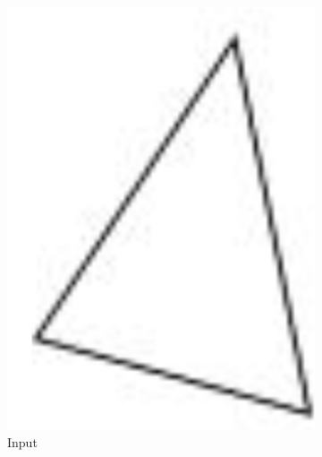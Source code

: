 \begin{figure}
	\centering
	\begin{subfigure}[b]{0.18\columnwidth}
		\centering
		\includegraphics[width=\textwidth]{content/img/implementation/tessellation_input.png}
		\caption{Input}
		\label{fig:implementation:step:input}
	\end{subfigure}
	\begin{subfigure}[b]{0.18\columnwidth}
		\centering

\end{subfigure}
\end{figure}
